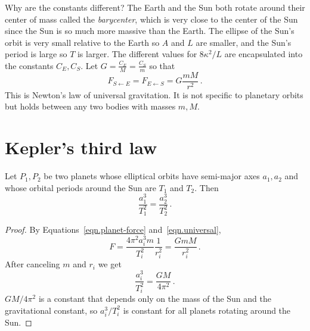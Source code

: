 Why are the constants different? The Earth and the Sun both rotate around their center of mass called the \emph{barycenter}, which is very close to the center of the Sun since the Sun is so much more massive than the Earth. The ellipse of the Sun's orbit is very small relative to the Earth so $A$ and $L$ are smaller, and the Sun's period is large so $T$ is larger. The different values for $8\kappa^2/L$ are encapsulated into the constants $C_E,C_S$. Let $G=\displaystyle\frac{C_E}{M}=\frac{C_S}{m}$ so that
\begin{equation}
F_{S\leftarrow E}=F_{E\leftarrow S}=G\frac{mM}{r^2}\,.\label{eqn.universal}
\end{equation}%
This is Newton's law of universal gravitation. It is not specific to planetary orbits but holds between any two bodies with masses $m,M$.

\section{Kepler's third law}

\begin{theorem}
Let $P_1, P_2$ be two planets whose elliptical orbits have semi-major axes $a_1, a_2$ and whose orbital periods around the Sun are $T_1$ and $T_2$. Then
\[
\frac{a_1^3}{T_1^2}=\frac{a_2^3}{T_2^2}\,.
\]
\end{theorem}
\begin{proof}
By Equations~\ref{eqn.planet-force} and~\ref{eqn.universal},
\begin{equation}
F=\frac{4\pi^2 a_i^3 m}{T_i^2}\frac{1}{r_i^2}=\frac{GmM}{r_i^2}\,.\label{eqn.third-law}
\end{equation}
After canceling $m$ and $r_i$ we get
\[
\frac{a_i^3}{T_i^2}=\frac{GM}{4\pi^2}\,.
\]
$GM/4\pi^2$ is a constant that depends only on the mass of the Sun and the gravitational constant, so $a_i^3/T_i^2$ is constant for all planets rotating around the Sun.\hqed
\end{proof}
